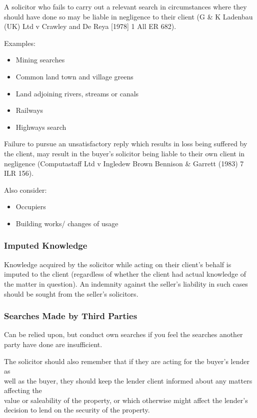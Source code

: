 \documentclass[
]{article}
\providecommand{\tightlist}{%
  \setlength{\itemsep}{0pt}\setlength{\parskip}{0pt}}
\begin{document}
A solicitor who fails to carry out a relevant search in circumstances
where they should have done so may be liable in negligence to their
client (G \& K Ladenbau (UK) Ltd v Crawley and De Reya {[}1978{]} 1 All
ER 682).

Examples:

\begin{itemize}
\tightlist
\item
  Mining searches
\item
  Common land town and village greens
\item
  Land adjoining rivers, streams or canals
\item
  Railways
\item
  Highways search
\end{itemize}

Failure to pursue an unsatisfactory reply which results in loss being
suffered by the client, may result in the buyer's solicitor being liable
to their own client in negligence (Computastaff Ltd v Ingledew Brown
Bennison \& Garrett (1983) 7 ILR 156).

Also consider:

\begin{itemize}
\tightlist
\item
  Occupiers
\item
  Building works/ changes of usage
\end{itemize}

\hypertarget{imputed-knowledge}{%
\subsubsection{Imputed Knowledge}\label{imputed-knowledge}}

Knowledge acquired by the solicitor while acting on their client's
behalf is imputed to the client (regardless of whether the client had
actual knowledge of the matter in question). An indemnity against the
seller's liability in such cases should be sought from the seller's
solicitors.

\hypertarget{searches-made-by-third-parties}{%
\subsubsection{Searches Made by Third
Parties}\label{searches-made-by-third-parties}}

Can be relied upon, but conduct own searches if you feel the searches
another party have done are insufficient.

The solicitor should also remember that if they are acting for the
buyer's lender as\\
well as the buyer, they should keep the lender client informed about any
matters affecting the\\
value or saleability of the property, or which otherwise might affect
the lender's decision to lend on the security of the property.
\end{document}
